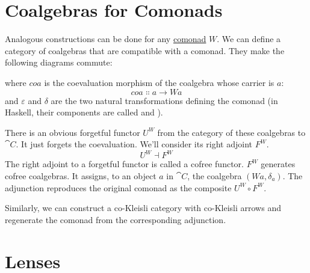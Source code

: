 \section{Coalgebras for Comonads}

Analogous constructions can be done for any
\hyperref[comonads]{comonad}
$W$. We can define a category of coalgebras that are compatible
with a comonad. They make the following diagrams commute:

\begin{figure}[H]
  \centering
  \begin{subfigure}
    \centering
  \end{subfigure}%
  \hspace{1cm}
  \begin{subfigure}
    \centering
  \end{subfigure}
\end{figure}

\noindent
where $\mathit{coa}$ is the coevaluation morphism of the coalgebra whose
carrier is $a$:
\[\mathit{coa} \Colon a \to W a\]
and $\varepsilon$ and $\delta$ are the two natural transformations
defining the comonad (in Haskell, their components are called
 and ).

There is an obvious forgetful functor $U^W$ from the category of
these coalgebras to $\cat{C}$. It just forgets the coevaluation. We'll
consider its right adjoint $F^W$.
\[U^W \dashv F^W\]
The right adjoint to a forgetful functor is called a cofree functor.
$F^W$ generates cofree coalgebras. It assigns, to an object
$a$ in $\cat{C}$, the coalgebra $(W a, \delta_a)$. The
adjunction reproduces the original comonad as the composite
$U^W \circ F^W$.

Similarly, we can construct a co-Kleisli category with co-Kleisli arrows
and regenerate the comonad from the corresponding adjunction.

\section{Lenses}

